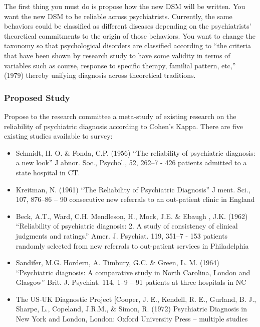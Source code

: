 \begin{refsection}
The first thing you must do is propose how the new DSM will be written. You want the new DSM to be reliable across psychiatrists. Currently, the same behaviors could be classified as different diseases depending on the psychiatrists' theoretical commitments to the origin of those behaviors. You want to change the taxonomy so that psychological disorders are classified according to ``the criteria that have been shown by research study to have some validity in terms of variables such as course, response to specific therapy, familial pattern, etc,'' (1979) thereby unifying diagnosis across theoretical traditions.

\subsubsection{Proposed Study}
\label{proposedstudy}

Propose to the research committee a meta-study of existing research on the reliability of psychiatric diagnosis according to Cohen's Kappa. There are five existing studies available to survey:

\begin{itemize}
\item Schmidt, H. O. \& Fonda, C.P. (1956) ``The reliability of psychiatric diagnosis: a new look'' J abnor. Soc., Psychol., 52, 262--7 - 426 patients admitted to a state hospital in CT.

\item Kreitman, N. (1961) ``The Reliability of Psychiatric Diagnosis'' J ment. Sci., 107, 876--86 – 90 consecutive new referrals to an out-patient clinic in England

\item Beck, A.T., Ward, C.H. Mendleson, H., Mock, J.E. \& Ebaugh , J.K. (1962) ``Reliability of psychiatric diagnosis: 2. A study of consistency of clinical judgments and ratings.'' Amer. J. Psychiat. 119, 351--7 - 153 patients randomly selected from new referrals to out-patient services in Philadelphia

\item Sandifer, M.G. Hordern, A. Timbury, G.C. \& Green, L. M. (1964) ``Psychiatric diagnosis: A comparative study in North Carolina, London and Glasgow'' Brit. J. Psychiat. 114, 1--9 – 91 patients at three hospitals in NC

\item The US-UK Diagnostic Project [Cooper, J. E., Kendell, R. E., Gurland, B. J., Sharpe, L., Copeland, J.R.M., \& Simon, R. (1972) Psychiatric Diagnosis in New York and London, London: Oxford University Press – multiple studies


\end{itemize}
\end{refsection}
